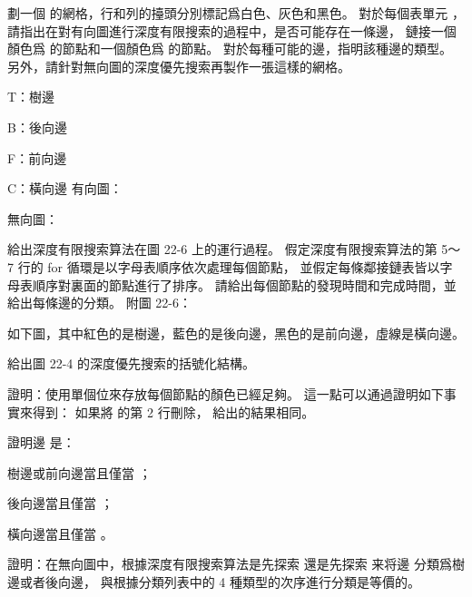 \startsection[
  title={Depth-first search},
]

\startEXERCISE
劃一個  的網格，行和列的擡頭分別標記爲白色、灰色和黑色。
對於每個表單元 ，
請指出在對有向圖進行深度有限搜索的過程中，是否可能存在一條邊，
鏈接一個顏色爲  的節點和一個顏色爲  的節點。
對於每種可能的邊，指明該種邊的類型。
另外，請針對無向圖的深度優先搜索再製作一張這樣的網格。
\stopEXERCISE

\startANSWER
\startcolumns[n=3, rule=on]
\startigBase[2]
\item T：樹邊
\item B：後向邊
\item F：前向邊
\item C：橫向邊
\stopigBase
\column
有向圖：

\column
無向圖：

\stopcolumns
\stopANSWER

\startEXERCISE[exercise:22.3-2]
給出深度有限搜索算法在圖 22-6 上的運行過程。
假定深度有限搜索算法的第 5～7 行的 {\EMP for} 循環是以字母表順序依次處理每個節點，
並假定每條鄰接鏈表皆以字母表順序對裏面的節點進行了排序。
請給出每個節點的發現時間和完成時間，並給出每條邊的分類。
附圖 22-6：

\externalfigure[output/e22_3_2-1]
\stopEXERCISE

\startANSWER
如下圖，其中紅色的是樹邊，藍色的是後向邊，黑色的是前向邊，虛線是橫向邊。

\externalfigure[output/e22_3_2-2]
\stopANSWER

\startEXERCISE
給出圖 22-4 的深度優先搜索的括號化結構。
\stopEXERCISE

\startANSWER
\externalfigure[output/e22_3_3-1]
\stopANSWER

\startEXERCISE
證明：使用單個位來存放每個節點的顏色已經足夠。
這一點可以通過證明如下事實來得到：
如果將  的第 2 行刪除，  給出的結果相同。
\stopEXERCISE

\startANSWER
{}
\stopANSWER

\startEXERCISE
證明邊  是：
\startigBase[a]
\item 樹邊或前向邊當且僅當 ；
\item 後向邊當且僅當 ；
\item 橫向邊當且僅當 。
\stopigBase
\stopEXERCISE

\startANSWER
{}
\stopANSWER

\startEXERCISE
證明：在無向圖中，根據深度有限搜索算法是先探索  還是先探索  来将邊  分類爲樹邊或者後向邊，
與根據分類列表中的 4 種類型的次序進行分類是等價的。
\stopEXERCISE


